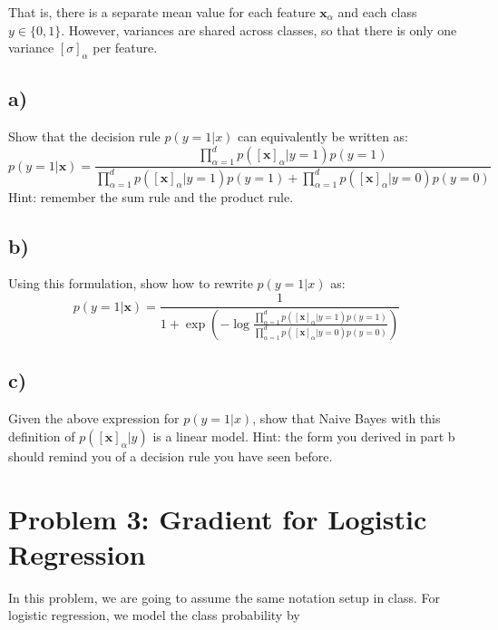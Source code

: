 \documentclass[a4paper]{article}
\begin{document}
That is, there is a separate mean value for each feature $\textbf{x}_{\alpha}$ and each class $y \in \{0, 1\}$. However, variances are shared across classes, so that there is only one variance $\left[\sigma\right]_{\alpha}$ per feature.
\subsection*{a)} 
Show that the decision rule $p(y=1|x)$ can equivalently be written as:
$$
p(y=1|\textbf{x}) = \frac{\prod_{\alpha=1}^{d} p([\textbf{x}]_{\alpha}|y=1)p(y=1)}{\prod_{\alpha=1}^{d} p([\textbf{x}]_{\alpha}|y=1)p(y=1)+\prod_{\alpha=1}^{d} p([\textbf{x}]_{\alpha}|y=0)p(y=0)}
$$
Hint: remember the sum rule and the product rule.

\subsection*{b)}
Using this formulation, show how to rewrite $p(y=1|x)$ as:
$$
p(y=1|\textbf{x}) = \frac{1}{1+\exp{\left(-\log\frac{\prod_{\alpha=1}^{d} p([\textbf{x}]_{\alpha}|y=1)p(y=1)}{\prod_{\alpha=1}^{d} p([\textbf{x}]_{\alpha}|y=0)p(y=0)}\right)}}
$$

\subsection*{c)}
Given the above expression for $p(y=1|x)$, show that Naive Bayes with this definition of $p([\textbf{x}]_{\alpha}|y)$ is a linear model. Hint: the form you derived in part b should remind you of a decision rule you have seen before.

\section*{Problem 3: Gradient for Logistic Regression}
	In this problem, we are going to assume the same notation setup in class. For logistic regression, we model the class probability by 
		
\end{document}
